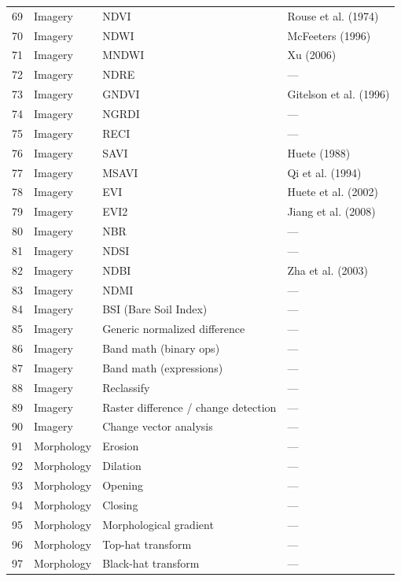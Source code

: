 \documentclass[11pt]{article}
\begin{document}
\begin{longtable}{@{}clp{5.5cm}p{4.5cm}@{}}
69 & Imagery & NDVI & Rouse et al. (1974) \\
70 & Imagery & NDWI & McFeeters (1996) \\
71 & Imagery & MNDWI & Xu (2006) \\
72 & Imagery & NDRE & --- \\
73 & Imagery & GNDVI & Gitelson et al. (1996) \\
74 & Imagery & NGRDI & --- \\
75 & Imagery & RECI & --- \\
76 & Imagery & SAVI & Huete (1988) \\
77 & Imagery & MSAVI & Qi et al. (1994) \\
78 & Imagery & EVI & Huete et al. (2002) \\
79 & Imagery & EVI2 & Jiang et al. (2008) \\
80 & Imagery & NBR & --- \\
81 & Imagery & NDSI & --- \\
82 & Imagery & NDBI & Zha et al. (2003) \\
83 & Imagery & NDMI & --- \\
84 & Imagery & BSI (Bare Soil Index) & --- \\
85 & Imagery & Generic normalized difference & --- \\
86 & Imagery & Band math (binary ops) & --- \\
87 & Imagery & Band math (expressions) & --- \\
88 & Imagery & Reclassify & --- \\
89 & Imagery & Raster difference / change detection & --- \\
90 & Imagery & Change vector analysis & --- \\

91  & Morphology & Erosion & --- \\
92  & Morphology & Dilation & --- \\
93  & Morphology & Opening & --- \\
94  & Morphology & Closing & --- \\
95  & Morphology & Morphological gradient & --- \\
96  & Morphology & Top-hat transform & --- \\
97  & Morphology & Black-hat transform & --- \\


\end{longtable}
\end{document}
